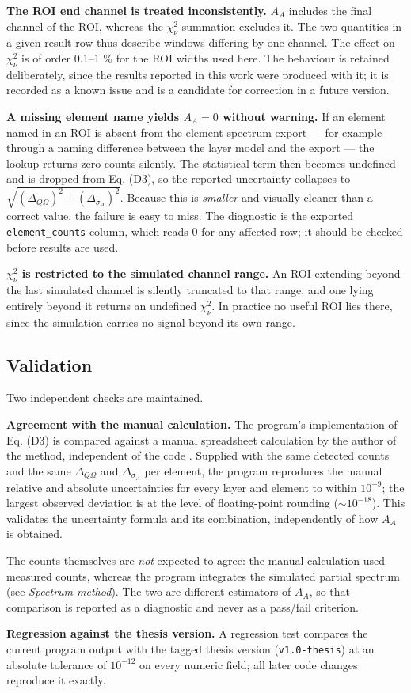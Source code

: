 \textbf{The ROI end channel is treated inconsistently.} \(A_A\) includes
the final channel of the ROI, whereas the \(\chi^2_\nu\) summation
excludes it. The two quantities in a given result row thus describe
windows differing by one channel. The effect on \(\chi^2_\nu\) is of
order 0.1--1 \% for the ROI widths used here. The behaviour is retained
deliberately, since the results reported in this work were produced with
it; it is recorded as a known issue and is a candidate for correction in
a future version.

\textbf{A missing element name yields \(A_A = 0\) without warning.} If
an element named in an ROI is absent from the element-spectrum export
--- for example through a naming difference between the layer model and
the export --- the lookup returns zero counts silently. The statistical
term then becomes undefined and is dropped from Eq. (D3), so the
reported uncertainty collapses to
\(\sqrt{(\Delta_{Q\Omega})^2 + (\Delta_{\sigma_A})^2}\). Because this is
\emph{smaller} and visually cleaner than a correct value, the failure is
easy to miss. The diagnostic is the exported \texttt{element\_counts}
column, which reads 0 for any affected row; it should be checked before
results are used.

\textbf{\(\chi^2_\nu\) is restricted to the simulated channel range.} An
ROI extending beyond the last simulated channel is silently truncated to
that range, and one lying entirely beyond it returns an undefined
\(\chi^2_\nu\). In practice no useful ROI lies there, since the
simulation carries no signal beyond its own range.

\subsection{Validation}\label{validation}

Two independent checks are maintained.

\textbf{Agreement with the manual calculation.} The program's
implementation of Eq. (D3) is compared against a manual spreadsheet
calculation by the author of the method, independent of the code
\citep{diallo2025iba}. Supplied with the same detected counts and the
same \(\Delta_{Q\Omega}\) and \(\Delta_{\sigma_A}\) per element, the
program reproduces the manual relative and absolute uncertainties for
every layer and element to within \(10^{-9}\); the largest observed
deviation is at the level of floating-point rounding
(\(\sim 10^{-18}\)). This validates the uncertainty formula and its
combination, independently of how \(A_A\) is obtained.

The counts themselves are \emph{not} expected to agree: the manual
calculation used measured counts, whereas the program integrates the
simulated partial spectrum (see \emph{Spectrum method}). The two are
different estimators of \(A_A\), so that comparison is reported as a
diagnostic and never as a pass/fail criterion.

\textbf{Regression against the thesis version.} A regression test
compares the current program output with the tagged thesis version
(\texttt{v1.0-thesis}) at an absolute tolerance of \(10^{-12}\) on every
numeric field; all later code changes reproduce it exactly.
